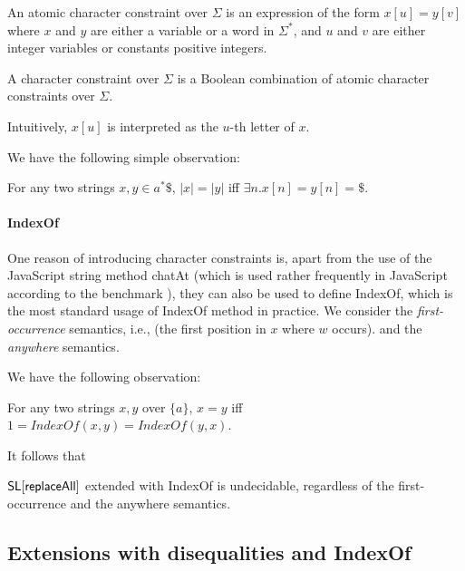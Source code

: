 \begin{definition}
	An atomic character constraint over $\Sigma$ is an expression of the form $x[u]=y[v]$ where $x$ and $y$ are either a variable or a word in $\Sigma^*$, and $u$ and $v$ are either integer variables or constants positive integers. 
	
	A character constraint over $\Sigma$ is a Boolean combination of atomic character constraints over $\Sigma$. 
\end{definition}

Intuitively, $x[u]$ is interpreted as the $u$-th letter of $x$. 

We have the following simple observation:

\begin{lemma}
	For any two strings $x,y\in a^*\$$, $|x|=|y|$ iff $\exists n. x[n]=y[n]=\$$. 
\end{lemma}

\paragraph{IndexOf}
One reason of introducing character constraints is, apart from the use of the JavaScript string method chatAt (which is used rather frequently in JavaScript according to the benchmark \cite{}), they can also be used to define IndexOf, which is the most standard usage of IndexOf method in practice. We consider the \emph{first-occurrence} semantics, i.e., (the first position in $x$ where $w$ occurs).
and the \emph{anywhere} semantics. 

We have the following observation: 
\begin{lemma}
	For any two strings $x,y$ over $\{a\}$, $x=y$ iff $1=IndexOf(x,y)=IndexOf(y,x)$.  
\end{lemma}

It follows that 
\begin{proposition}
	$\mathsf{SL}[\mathsf{replaceAll}]$ extended with IndexOf is undecidable, regardless of the first-occurrence and the anywhere semantics. 
\end{proposition}

\subsection{Extensions with disequalities and IndexOf}